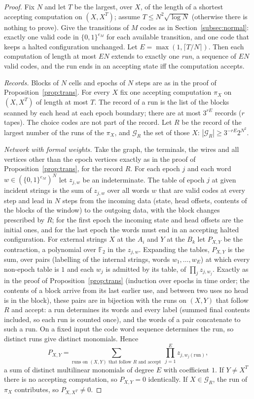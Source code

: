 \documentclass[11pt]{article}
\theoremstyle{definition}
\theoremstyle{remark}
\newcommand{\F}{\mathbb F}
\begin{document}
\begin{proof}
Fix $N$ and let $T$ be the largest, over $X$, of the length of a shortest accepting computation on $(X,X^T)$; assume
$T\le N^2\sqrt{\log N}$ (otherwise there is nothing to prove). Give the transitions of $M$ codes as in
Section~\ref{subsec:normal}: exactly one valid code in $\{0,1\}^{e_M}$ for each available transition, and one code that keeps a
halted configuration unchanged. Let $E=\max(1,\lceil T/N\rceil)$. Then each computation of length at most $EN$ extends to exactly one
\emph{run}, a sequence of $EN$ valid codes, and the run ends in an accepting state iff the computation accepts.

\emph{Records.} Blocks of $N$ cells and epochs of $N$ steps are as in the proof of Proposition~\ref{prop:trans}. For every $X$ fix
one accepting computation $\pi_X$ on $(X,X^T)$ of length at most $T$. The record of a run is the list of the blocks scanned by each
head at each epoch boundary; there are at most $3^{rE}$ records ($r$ tapes). The choice codes are not part of the record. Let $R$
be the record of the largest number of the runs of the $\pi_X$, and $\mathcal G_R$ the set of those $X$:
$|\mathcal G_R|\ge3^{-rE}2^{N^2}$.

\emph{Network with formal weights.} Take the graph, the terminals, the wires and all vertices other than the epoch vertices exactly as
in the proof of Proposition~\ref{prop:trans}, for the record $R$. For each epoch $j$ and each word $w\in(\{0,1\}^{e_M})^N$ let
$z_{j,w}$ be an indeterminate. The table of epoch $j$ at given incident strings is the sum of $z_{j,w}$ over all words $w$ that are
valid codes at every step and lead in $N$ steps from the incoming data (state, head offsets, contents of the blocks of the window)
to the outgoing data, with the block changes prescribed by $R$; for the first epoch the incoming state and head offsets are the
initial ones, and for the last epoch the words must end in an accepting halted configuration. For external strings $X$ at the $A_i$ and $Y$ at the $B_k$ let $P_{X,Y}$ be the contraction, a polynomial over
$\F_2$ in the $z_{j,w}$. Expanding the tables, $P_{X,Y}$ is the sum, over pairs (labelling of the internal strings, words
$w_1,\dots,w_E$) at which every non-epoch table is $1$ and each $w_j$ is admitted by its table, of $\prod_jz_{j,w_j}$. Exactly as in
the proof of Proposition~\ref{prop:trans} (induction over epochs in time order; the contents of a block arrive from its last earlier
use, and between two uses no head is in the block), these pairs are in bijection with the runs on $(X,Y)$ that follow $R$ and
accept: a run determines its words and every label (summed final contents included, so each run is counted once), and the words of
a pair concatenate to such a run. On a fixed input the code word sequence determines the run, so distinct runs give distinct
monomials. Hence
\[
 P_{X,Y}=\sum_{\text{runs on }(X,Y)\text{ that follow }R\text{ and accept}}\ \prod_{j=1}^{E}z_{j,w_j(\text{run})},
\]
a sum of distinct multilinear monomials of degree $E$ with coefficient $1$. If $Y\ne X^T$ there is no accepting computation, so
$P_{X,Y}=0$ identically. If $X\in\mathcal G_R$, the run of $\pi_X$ contributes, so $P_{X,X^T}\ne0$.


\end{proof}
\end{document}
